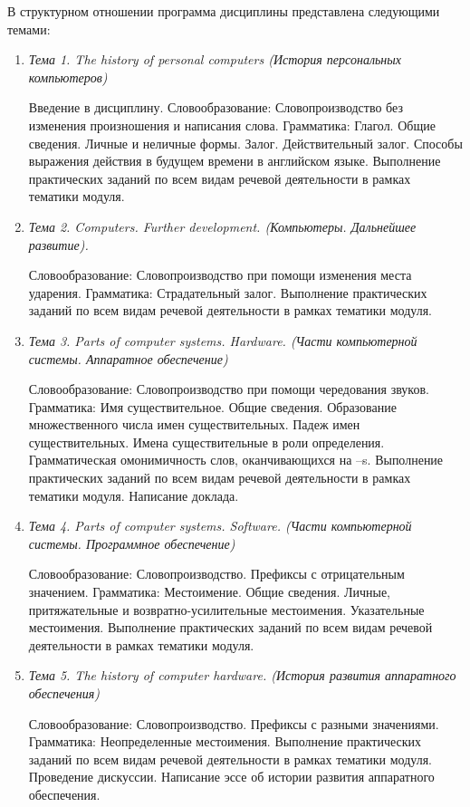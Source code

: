 В структурном отношении программа дисциплины представлена следующими темами:
\begin{enumerate}
\item \textit{Тема 1. The history of personal computers (История персональных компьютеров)}\par
Введение в дисциплину. Словообразование: Словопроизводство без изменения произношения и написания слова. Грамматика: Глагол. Общие сведения. Личные и неличные формы. Залог.  Действительный залог. Способы выражения действия в будущем времени в английском языке.
Выполнение практических заданий по всем видам речевой деятельности в рамках тематики модуля. 
\item \textit{Тема 2. Computers. Further development. (Компьютеры. Дальнейшее развитие).} \par	
Словообразование: Словопроизводство при помощи изменения места ударения. Грамматика: Страдательный залог. Выполнение практических заданий по всем видам речевой деятельности в рамках тематики модуля. 
\item \textit{Тема 3. Parts of computer systems. Hardware. (Части компьютерной системы. Аппаратное обеспечение)} \par	Словообразование: Словопроизводство при помощи чередования звуков.
Грамматика: Имя существительное. Общие сведения. Образование множественного числа имен существительных. Падеж имен существительных. Имена существительные в роли определения. Грамматическая омонимичность слов, оканчивающихся на –s. 
Выполнение практических заданий по всем видам речевой деятельности в рамках тематики модуля. Написание доклада.
\item \textit{Тема 4. Parts of computer systems. Software. (Части компьютерной системы. Программное обеспечение)}	
\par Словообразование: Словопроизводство. Префиксы с отрицательным значением. Грамматика: Местоимение. Общие сведения. Личные, притяжательные и возвратно-усилительные местоимения. Указательные местоимения. Выполнение практических заданий по всем видам речевой деятельности в рамках тематики модуля. 
\item \textit{Тема 5. The history of computer hardware. (История развития аппаратного обеспечения)} \par	
Словообразование: Словопроизводство. Префиксы с разными значениями.
Грамматика: Неопределенные местоимения. Выполнение практических заданий по всем видам речевой деятельности в рамках тематики модуля. Проведение дискуссии. Написание эссе об истории развития аппаратного обеспечения.

\end{enumerate}
